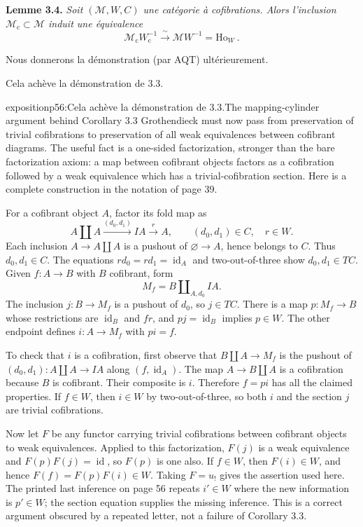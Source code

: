 \textbf{Lemme 3.4.} \textit{Soit $(\mathcal{M},W,C)$ une catégorie à cofibrations. Alors l'inclusion $\mathcal{M}_{\mathrm{c}}\subset\mathcal{M}$ induit une équivalence}
\[
\mathcal{M}_{\mathrm{c}}W_{\mathrm{c}}^{-1} \xrightarrow{\ \sim\ } \mathcal{M}W^{-1}=\mathrm{Ho}_W\ .
\]

Nous donnerons la démonstration (par AQT) ultérieurement.

Cela achève la démonstration de 3.3.

\begin{dcomment}{exposition}{p56:Cela achève la démonstration de 3.3.}{The mapping-cylinder argument behind Corollary 3.3}
Grothendieck must now pass from preservation of trivial cofibrations to preservation of all weak equivalences between cofibrant diagrams. The useful fact is a one-sided factorization, stronger than the bare factorization axiom: a map between cofibrant objects factors as a cofibration followed by a weak equivalence which has a trivial-cofibration section. Here is a complete construction in the notation of page 39.

For a cofibrant object $A$, factor its fold map as
\[
 A\amalg A\xrightarrow{(d_0,d_1)}IA\xrightarrow{r}A,
 \qquad (d_0,d_1)\in C,\quad r\in W.
\]
Each inclusion $A\to A\amalg A$ is a pushout of $\varnothing\to A$, hence belongs to $C$. Thus $d_0,d_1\in C$. The equations $rd_0=rd_1=\operatorname{id}_A$ and two-out-of-three show $d_0,d_1\in TC$. Given $f:A\to B$ with $B$ cofibrant, form
\[
 M_f=B\amalg_{A,d_0}IA.
\]
The inclusion $j:B\to M_f$ is a pushout of $d_0$, so $j\in TC$. There is a map $p:M_f\to B$ whose restrictions are $\operatorname{id}_B$ and $fr$, and $pj=\operatorname{id}_B$ implies $p\in W$. The other endpoint defines $i:A\to M_f$ with $pi=f$.

To check that $i$ is a cofibration, first observe that $B\amalg A\to M_f$ is the pushout of $(d_0,d_1):A\amalg A\to IA$ along $(f,\operatorname{id}_A)$. The map $A\to B\amalg A$ is a cofibration because $B$ is cofibrant. Their composite is $i$. Therefore $f=pi$ has all the claimed properties. If $f\in W$, then $i\in W$ by two-out-of-three, so both $i$ and the section $j$ are trivial cofibrations.

Now let $F$ be any functor carrying trivial cofibrations between cofibrant objects to weak equivalences. Applied to this factorization, $F(j)$ is a weak equivalence and $F(p)F(j)=\operatorname{id}$, so $F(p)$ is one also. If $f\in W$, then $F(i)\in W$, and hence $F(f)=F(p)F(i)\in W$. Taking $F=u_!$ gives the assertion used here. The printed last inference on page 56 repeats $i'\in W$ where the new information is $p'\in W$; the section equation supplies the missing inference. This is a correct argument obscured by a repeated letter, not a failure of Corollary 3.3.
\end{dcomment}


